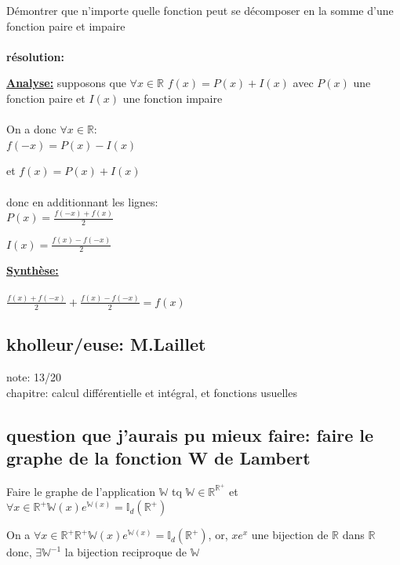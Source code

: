 \documentclass{article}
\begin{document}
\vspace{0.5cm}

Démontrer que n'importe quelle fonction peut se décomposer en la somme d'une fonction paire et impaire \\ \\

\textbf{\large{résolution:}}

\vspace{5mm}

\underline{\textbf{Analyse:}} supposons que $ \forall x \in \mathbb{R}$ $f(x) = P(x) + I(x) $ avec $ P(x) $ une fonction paire et $I(x)$ une fonction impaire \\ \\
On a donc $\forall x \in \mathbb{R}:$ \\

$f(-x) = P(x) - I(x)$

et $f(x) = P(x) + I(x)$ \\ \\
donc en additionnant les lignes: \\

$P(x) = \frac{f(-x) + f(x)}{2}$

$I(x) = \frac{f(x) - f(-x)}{2}$

\vspace{5mm}
\underline{\textbf{Synthèse:}}\\ \\
$\frac{f(x) + f(-x)}{2} + \frac{f(x) - f(-x)}{2} = f(x)$


\subsection{kholleur/euse: M.Laillet}

note: 13/20 \\
chapitre: calcul différentielle et intégral, et fonctions usuelles

\subsection{question que j'aurais pu mieux faire: faire le graphe de la fonction W de Lambert}

Faire le graphe de l'application $\mathbb{W}$ tq $ \mathbb{W} \in \mathbb{R}^{\mathbb{R^{+}}}$ et $\forall x \in \mathbb{R^{+}} \mathbb{W}(x)e^{\mathbb{W}(x)} = \mathbb{I}_d(\mathbb{R^{+}})$

On a $\forall x \in \mathbb{R}^+ \mathbb{R^{+}} \mathbb{W}(x)e^{\mathbb{W}(x)} = \mathbb{I}_d(\mathbb{R^{+}})$, or, $xe^x$ une bijection de $\mathbb{R}$ dans $\mathbb{R}$ donc, $\exists \mathbb{W}^{-1}$ la bijection reciproque de $\mathbb{W}$
\end{document}
